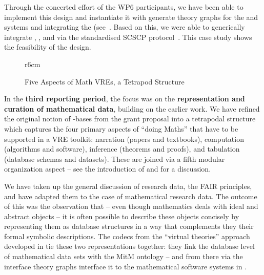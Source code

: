 Through the concerted effort of the WP6 participants, we have been able to implement this design and instantiate it with generate theory graphs for the \GAP and \Sage systems and integrating the \LMFDB (see~\cite{ODK-D6.5}.
Based on this, we were able to generically integrate \GAP, \Sage, and \LMFDB via the standardised SCSCP protocol~\cite{HorRoz:ossp09}. This case study shows the feasibility of the design. 

\begin{wrapfigure}r{6cm}\vspace*{-1em}
\vspace*{.5em}
\caption{Five Aspects of Math VREs, a Tetrapod Structure}\label{fig:tetrapod}\vspace*{-1.5em}
\end{wrapfigure}
In the \textbf{third reporting period}, the focus was on the \textbf{representation and curation of mathematical data}, building on the earlier work. We have refined the original notion of \DKS-bases from the grant proposal into a tetrapodal structure which captures the four primary aspects of ``doing Maths'' that have to be supported in a VRE toolkit: narration (papers and textbooks), computation (algorithms and software), inference (theorems and proofs), and tabulation (database schemas and datasets).
These are joined via a fifth modular organization aspect -- see the introduction  of \cite{ODK-D6.10} and \cite{CarFarKohRab:bmobb19} for a discussion.

We have taken up the general discussion of research data, the FAIR principles, and have adapted them to the case of mathematical research data. The outcome of this was the observation that -- even though mathematics deals with ideal and abstract objects -- it is often possible to describe these objects concisely by representing them as database structures in a way that complements they their formal symbolic descriptions. The codecs from the ``virtual theories'' approach developed in  tie these two representations together: they link the database level of mathematical data sets with the MitM ontology -- and from there via the interface theory graphs interface it to the mathematical software systems in \pn.

